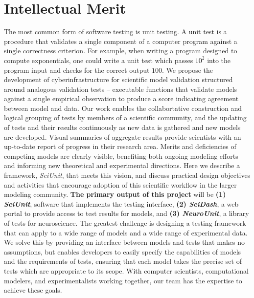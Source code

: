 \documentclass[11pt,letterpaper]{article}
\begin{document}
\section{Intellectual Merit}
The most common form of software testing is unit testing. 
A unit test is a procedure that validates a single component of a computer program against a single correctness criterion. 
For example, when writing a program designed to compute exponentials, one could write a unit test which passes $10^2$ into the program input and checks for the correct output $100$.   
We propose the development of cyberinfrastructure for scientific model validation structured around analogous validation tests -- 
executable functions that validate models against a single empirical observation to produce a score indicating agreement between model and data. 
Our work enables the collabortative construction and logical grouping of tests by members of a scientific community, and the updating of tests and their results continuously as new data is gathered and new models are developed. 
Visual summaries of aggregate results provide scientists with an up-to-date report of progress in their research area. 
Merits and deficiencies of competing models are clearly visible, benefiting both ongoing modeling efforts and informing new theoretical and experimental directions. 
Here we describe a framework, \textit{SciUnit}, that meets this vision, and discuss practical design objectives and activities that encourage adoption of this scientific workflow in the larger modeling community. 
\textbf{The primary output of this project} will be \textbf{(1) \textit{SciUnit}}, software that implements the testing interface, \textbf{(2) \textit{SciDash}}, a web portal to provide access to test results for models, and \textbf{(3) \textit{NeuroUnit}}, a library of tests for neuroscience.  
The greatest challenge is designing a testing framework that can apply to a wide range of models and a wide range of experimental data.  
We solve this by providing an interface between models and tests that makes no assumptions, but enables developers to easily specify the capabilities of models and the requirements of tests, ensuring that each model takes the precise set of tests which are appropriate to its scope.  
With computer scientists, computational modelers, and experimentalists working together, our team has the expertise to achieve these goals. 
\end{document}
